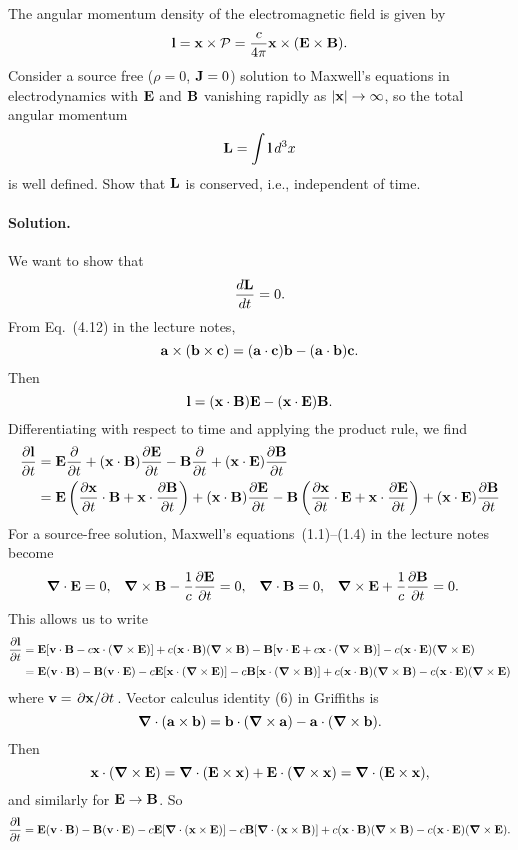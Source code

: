 \documentclass[11pt]{article}
\newcommand{\beq}{\begin{equation*}}
\newcommand{\eeq}{\end{equation*}}
\newcommand{\beqn}{\begin{equation}}
\newcommand{\eeqn}{\end{equation}}
\newenvironment{statement}[1]
{
	\section{#1}
	\color{darkgray}
	\ignorespaces
}
{
}
\newenvironment{solution}
{
    \paragraph{Solution.}
    \ignorespaces
}
{
    \bigskip
}
\begin{document}
\begin{statement}{}
	The angular momentum density of the electromagnetic field is given by
	\beq
		\vl = \vx \times \vcP
		= \frac{c}{4\pi} \vx \times (\vE \times \vB).
	\eeq
	Consider a source free ($\rho = 0$, $\vb{J} = 0$) solution to Maxwell's equations in electrodynamics with $\vb{E}$ and $\vb{B}$ vanishing rapidly as $\abs{\vb{x}} \to \infty$, so the total angular momentum
	\beq
		\vL = \int \vl \dcx
	\eeq
	is well defined.  Show that $\vb{L}$ is conserved, i.e., independent of time.
\end{statement}

\begin{solution}
	We want to show that
	\beq
		\dv{\vL}{t} = 0.
	\eeq
	From Eq.~(4.12) in the lecture notes,
	\beqn \label{baccab}
		\vaa \times (\vbb \times \vc) = (\vaa \cdot \vc) \vbb - (\vaa \cdot \vbb) \vc.
	\eeqn
	Then
	\beq
		\vl = (\vx \cdot \vB) \vE - (\vx \cdot \vE) \vB.
	\eeq
	Differentiating with respect to time and applying the product rule, we find
	\begin{align*}
		\pdv{\vb{l}}{t} &= \vb{E} \pdv{}{t} (\vb{x} \cdot \vb{B}) + (\vb{x} \cdot \vb{B}) \pdv{\vb{E}}{t} - \vb{B} \pdv{}{t} (\vb{x} \cdot \vb{E}) + (\vb{x} \cdot \vb{E}) \pdv{\vb{B}}{t} \\
		&= \vb{E} \left(\pdv{\vb{x}}{t} \cdot \vb{B} + \vb{x} \cdot \pdv{\vb{B}}{t} \right) + (\vb{x} \cdot \vb{B}) \pdv{\vb{E}}{t} - \vb{B} \left (\pdv{\vb{x}}{t} \cdot \vb{E} + \vb{x} \cdot \pdv{\vb{E}}{t} \right) + (\vb{x} \cdot \vb{E}) \pdv{\vb{B}}{t}
	\end{align*}
	For a source-free solution, Maxwell's equations~(1.1)--(1.4) in the lecture notes become
	\begin{align*}
		\grad \cdot \vb{E} &= 0, &
		\grad \times \vb{B} - \frac{1}{c} \pdv{\vb{E}}{t} &= 0, &
		\grad \cdot \vb{B} &= 0, &
		\grad \times \vb{E} + \frac{1}{c} \pdv{\vb{B}}{t} &= 0.
	\end{align*}
	This allows us to write
	\begin{align*}
		\pdv{\vb{l}}{t} &= \vb{E} [\vb{v} \cdot \vb{B} - c \vb{x} \cdot (\grad \times \vb{E})] + c (\vb{x} \cdot \vb{B}) (\grad \times \vb{B}) - \vb{B} [\vb{v} \cdot \vb{E} + c \vb{x} \cdot (\grad \times \vb{B})] - c (\vb{x} \cdot \vb{E}) (\grad \times \vb{E}) \\
		&= \vb{E} (\vb{v} \cdot \vb{B}) - \vb{B} (\vb{v} \cdot \vb{E}) - c \vb{E} [ \vb{x} \cdot (\grad \times \vb{E}) ] - c \vb{B} [ \vb{x} \cdot (\grad \times \vb{B}) ] + c (\vb{x} \cdot \vb{B}) (\grad \times \vb{B}) - c (\vb{x} \cdot \vb{E}) (\grad \times \vb{E})
	\end{align*}
	where $\vb{v} = \pdv*{\vb{x}}{t}$.  
	Vector calculus identity (6) in Griffiths is
	\beq
		\grad \cdot (\vaa \times \vbb) = \vbb \cdot (\grad \times \vaa) - \vaa \cdot (\grad \times \vbb).
	\eeq
	Then
	\beq
		\vx \cdot (\grad \times \vE) = \grad \cdot (\vE \times \vx) + \vE \cdot (\grad \times \vx)
		= \grad \cdot (\vE \times \vx),
	\eeq
	and similarly for $\vb{E} \to \vb{B}$.  So
	\beq
		\pdv{\vl}{t} = \vE (\vv \cdot \vB) - \vB (\vv \cdot \vE) - c \vE [ \grad \cdot (\vx \times \vE) ] - c \vB [ \grad \cdot (\vx \times \vB) ] + c (\vx \cdot \vB) (\grad \times \vB) - c (\vx \cdot \vE) (\grad \times \vE).
	\eeq
	

\end{solution}
\end{document}
